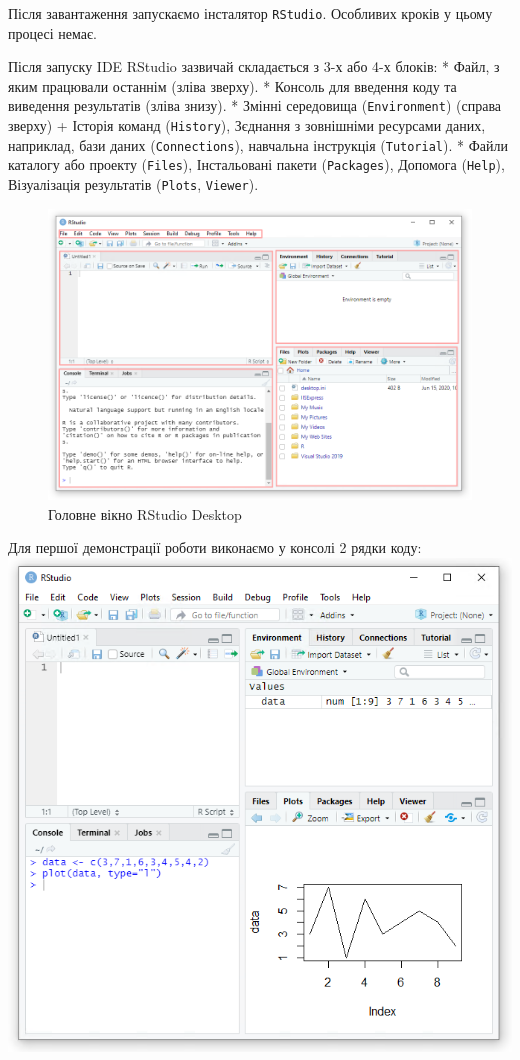 \documentclass[
]{book}
\begin{document}
Після завантаження запускаємо інсталятор \texttt{RStudio}. Особливих кроків у цьому процесі немає.

Після запуску IDE RStudio зазвичай складається з 3-х або 4-х блоків:
* Файл, з яким працювали останнім (зліва зверху).
* Консоль для введення коду та виведення результатів (зліва знизу).
* Змінні середовища (\texttt{Environment}) (справа зверху) + Історія команд (\texttt{History}), Зєднання з зовнішніми ресурсами даних, наприклад, бази даних (\texttt{Connections}), навчальна інструкція (\texttt{Tutorial}).
* Файли каталогу або проекту (\texttt{Files}), Інстальовані пакети (\texttt{Packages}), Допомога (\texttt{Help}), Візуалізація результатів (\texttt{Plots}, \texttt{Viewer}).

\begin{figure}
\centering
\includegraphics{images/chapter1/rstudio_3.png}
\caption{\label{fig:unnamed-chunk-15}Головне вікно RStudio Desktop}
\end{figure}

Для першої демонстрації роботи виконаємо у консолі 2 рядки коду:
\includegraphics{images/chapter1/rstudio_4.png}
\end{document}
